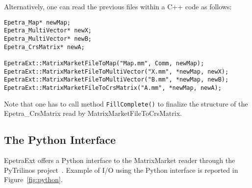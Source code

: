 \documentclass[11pt,relax]{SANDreport}
\begin{document}
Alternatively, one can read the
previous files within a C++ code as follows:
\begin{verbatim}
Epetra_Map* newMap;
Epetra_MultiVector* newX;
Epetra_MultiVector* newB;
Epetra_CrsMatrix* newA;

EpetraExt::MatrixMarketFileToMap("Map.mm", Comm, newMap);
EpetraExt::MatrixMarketFileToMultiVector("X.mm", *newMap, newX);
EpetraExt::MatrixMarketFileToMultiVector("B.mm", *newMap, newB);
EpetraExt::MatrixMarketFileToCrsMatrix("A.mm", *newMap, newA);
\end{verbatim}
Note that one has to call method {\tt FillComplete()} to finalize the
structure of the Epetra\_CrsMatrix read by MatrixMarketFileToCrsMatrix.

\subsection{The Python Interface}
\label{sec:mm:python}

EpetraExt offers a Python interface to the MatrixMarket reader through the
PyTrilinos project~\cite{pytrilinos-la-guide,sala05pytrilinos}.  Example of
I/O using the Python interface is reported in Figure~\ref{fig:python}.
\end{document}
